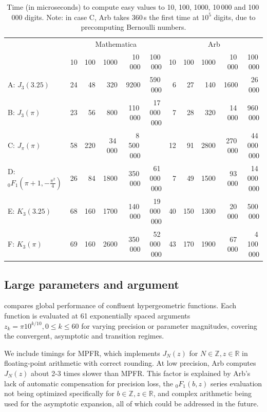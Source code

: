 \documentclass[11pt]{article}
\begin{document}
\begin{table}
\renewcommand{\arraystretch}{1.4}
\setlength{\tabcolsep}{.4em}
\begin{center}
\begin{scriptsize}
\begin{tabular}{l | r r r r r | r r r r r}
   &  \multicolumn{5}{|c|}{Mathematica}  &  \multicolumn{5}{|c}{Arb}    \\
  & 10 & 100 & 1000 & 10\,000 & 100\,000 & 10 & 100 & 1000 & 10\,000 & 100\,000 \\ \hline
A: $J_3(3.25)$ &
24 & 48 & 320 & 9200 & 590\,000 &
6 & 27 & 140 & 1600 & 26\,000 \\
B: $J_3(\pi)$ &
23 & 56 & 800 & 110\,000 & 17\,000\,000 &
7 & 28 & 320 & 14\,000 & 960\,000 \\
C: $J_{\pi}(\pi)$ &
58 & 220 & 34\,000 & 8\,500\,000 &  &
12 & 91 & 2800 & 270\,000 & 44\,000\,000 \\
D: ${}_0F_1(\pi\!+\!1,-\tfrac{\pi^2}{4})\!$ &
26 & 84 & 1800 & 350\,000 & 61\,000\,000 &
7 & 49 & 1500 & 93\,000 & 14\,000\,000 \\
E: $K_3(3.25)$ &
68 & 160 & 1700 & 140\,000 & 19\,000\,000 &
40 & 150 & 1300 & 20\,000 & 500\,000 \\
F: $K_3(\pi)$ &
69 & 160 & 2600 & 350\,000 & 52\,000\,000 &
43 & 170 & 1900 & 67\,000 & 4\,100\,000 \\
\end{tabular}
\end{scriptsize}
\caption{Time (in microseconds) to compute easy values to
10, 100, 1000, 10\,000 and 100\,000 digits.
Note: in case C, Arb takes 360\,s the first time at $10^5$ digits, due to
precomputing Bernoulli numbers.}
\label{tab:prectimings}
\end{center}
\end{table}

\subsection{Large parameters and argument}

 compares global performance of
confluent hypergeometric functions.
Each function is evaluated at 61 exponentially spaced arguments
$z_k = \pi 10^{k/10}, 0 \le k \le 60$
for varying precision or parameter magnitudes,
covering the convergent, asymptotic and transition regimes.

We include timings for MPFR, which implements $J_N(z)$ for $N \in \mathbb{Z}, z \in \mathbb{R}$
in floating-point arithmetic with correct rounding.
At low precision, Arb computes $J_N(z)$ about 2-3 times slower than MPFR.
This factor is explained by Arb's lack of automatic compensation for precision loss,
the ${}_0F_1(b,z)$ series evaluation not being optimized specifically for $b \in \mathbb{Z}, z \in \mathbb{R}$,
and complex arithmetic being used for the asymptotic expansion,
all of which could be addressed in the future.
\end{document}
